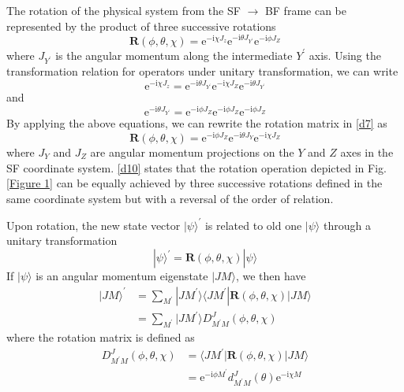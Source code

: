 \documentclass[]{article}
\begin{document}
The rotation of the physical system from the SF $\rightarrow$ BF frame can be represented by the product of three successive rotations
\begin{equation}
	\mathbf{R}(\phi,\theta,\chi)=\mathrm{e}^{-\mathrm{i}\chi J_z}\mathrm{e}^{-\mathrm{i}\theta J_{Y^\prime}}\mathrm{e}^{-\mathrm{i}\phi J_Z}
	\label{d7}
\end{equation}
where $J_{Y^\prime}$ is the angular momentum along the intermediate $Y^\prime$ axis. Using the transformation relation for operators under unitary transformation, we can write
\begin{equation}
	\mathrm{e}^{-\mathrm{i}\chi J_z}=\mathrm{e}^{-\mathrm{i}\theta J_{Y^\prime}}\mathrm{e}^{-\mathrm{i}\chi J_Z}\mathrm{e}^{-\mathrm{i}\theta J_{Y^\prime}}
\end{equation}
and 
\begin{equation}
	\mathrm{e}^{-\mathrm{i}\theta J_{Y^\prime}}=\mathrm{e}^{-\mathrm{i}\phi J_Z}\mathrm{e}^{-\mathrm{i}\phi J_Z}\mathrm{e}^{-\mathrm{i}\phi J_Z}
\end{equation}
By applying the above equations, we can rewrite the rotation matrix in \eqref{d7} as
\begin{equation}
	\mathbf{R}(\phi,\theta,\chi)=\mathrm{e}^{-\mathrm{i}\phi J_Z}\mathrm{e}^{-\mathrm{i}\theta J_Y}\mathrm{e}^{-\mathrm{i}\chi J_Z}
	\label{d10}
\end{equation}
where $J_Y$ and $J_Z$ are angular momentum projections on the $Y$ and $Z$ axes in the SF coordinate system. \eqref{d10} states that the rotation operation depicted in Fig.\ref{Figure 1} can be equally achieved by three successive rotations defined in the same coordinate system but with a reversal of the order of relation.\par 
Upon rotation, the new state vector $|\psi\rangle^\prime$ is related to old one $|\psi\rangle$ through a unitary transformation
\begin{equation}
	|\psi\rangle^\prime=\mathbf{R}(\phi,\theta,\chi)|\psi\rangle
\end{equation}
If $|\psi\rangle$ is an angular momentum eigenstate $| JM\rangle$, we then have
\begin{align}
	|JM\rangle^\prime&=\sum\limits_{M^\prime}|JM^\prime\rangle\langle JM^\prime|\mathbf{R}(\phi,\theta,\chi)|JM\rangle\nonumber\\
	&=\sum\limits_{M^\prime}|JM^\prime\rangle D^J_{M^\prime M}(\phi,\theta,\chi)
\end{align}
where the rotation matrix is defined as 
\begin{align}
	D^J_{M^\prime M}(\phi,\theta,\chi)&=\langle JM^\prime|\mathbf{R}(\phi,\theta,\chi)|JM\rangle\nonumber\\
	&=\mathrm{e}^{-\mathrm{i}\phi M^\prime}d^J_{M^\prime M}(\theta)\mathrm{e}^{-\mathrm{i}\chi M}
\end{align}
\end{document}
